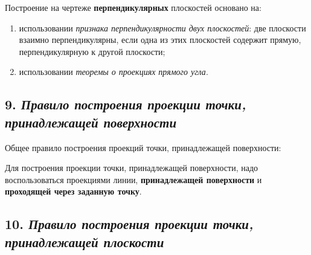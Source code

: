 \begin{mainQuote}
    
\end{mainQuote}

Построение на чертеже {\bf перпендикулярных} плоскостей основано на:
\begin{enumerate}
    \item использовании \textit {признака перпендикулярности двух плоскостей}: две плоскости взаимно перпендикулярны, если одна из этих плоскостей содержит прямую, перпендикулярную к другой плоскости;
    \item использовании \textit {теоремы о проекциях прямого угла}.
\end{enumerate}




\newpage
\subsection*{9. \textit{Правило построения проекции точки, принадлежащей поверхности}}

\begin{mainQuote}
\end{mainQuote}

Общее правило построения проекций точки, принадлежащей поверхности:

Для построения проекции точки, принадлежащей поверхности, надо воспользоваться проекциями линии, {\bf принадлежащей поверхности} и {\bf проходящей через заданную точку}. 


\newpage
\subsection*{10. \textit{Правило построения проекции точки, принадлежащей плоскости}}

\begin{mainQuote}
    
\end{mainQuote}


